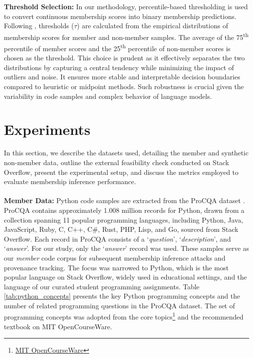 \documentclass[runningheads]{llncs}
\begin{document}
\noindent \textbf{Threshold Selection:} In our methodology, percentile-based thresholding is used to convert continuous membership scores into binary membership predictions. Following \cite{r68}, thresholds (\(\tau\)) are calculated from the empirical distributions of membership scores for member and non-member samples. The average of the 75\textsuperscript{th} percentile of member scores and the 25\textsuperscript{th} percentile of non-member scores is chosen as the threshold. This choice is prudent as it effectively separates the two distributions by capturing a central tendency while minimizing the impact of outliers and noise. It ensures more stable and interpretable decision boundaries compared to heuristic or midpoint methods. Such robustness is crucial given the variability in code samples and complex behavior of language models. 




\section{Experiments} \label{non}

In this section, we describe the datasets used, detailing the member and synthetic non-member data, outline the external feasibility check conducted on Stack Overflow, present the experimental setup, and discuss the metrics employed to evaluate membership inference performance.\\ \\
\noindent \textbf{Member Data:}
Python code samples are extracted from the ProCQA dataset \cite{r20}. ProCQA contains approximately 1.008 million records for Python, drawn from a collection spanning 11 popular programming languages, including Python, Java, JavaScript, Ruby, C, C++, C\#, Rust, PHP, Lisp, and Go,  sourced from Stack Overflow. Each record in ProCQA consists of a `\textit{question}', `\textit{description}', and `\textit{answer}'. For our study, only the `\textit{answer}' record was used. These samples serve as our \textit{member} code corpus for subsequent membership inference attacks and provenance tracking. The focus was narrowed to Python, which is the most popular language on Stack Overflow, widely used in educational settings, and the language of our curated student programming assignments. Table \ref{tab:python_concepts} presents the key Python programming concepts and the number of related programming questions in the ProCQA dataset. The set of programming concepts was adopted from the core topics\footnote{\href{https://ocw.mit.edu/courses/6-0001-introduction-to-computer-science-and-programming-in-python-fall-2016/pages/readings/}{MIT OpenCourseWare}} and the recommended textbook on MIT OpenCourseWare.
\end{document}
